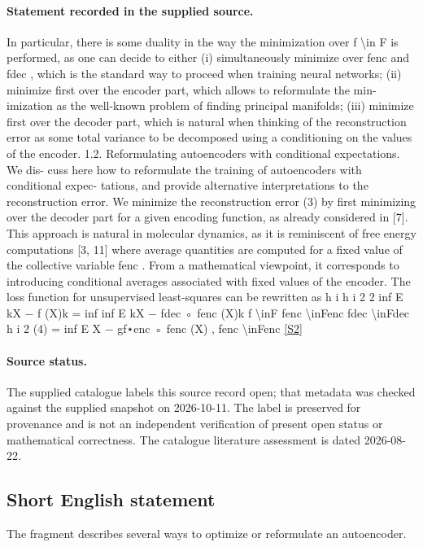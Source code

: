 \documentclass[11pt]{article}
\newcommand{\sref}[2]{\hyperlink{source:#1:#2}{[S#2]}}
\begin{document}
\paragraph{Statement recorded in the supplied source.}
In particular, there is some duality in the way the minimization over f \textbackslash{}in F is performed, as one can decide to either (i) simultaneously minimize over fenc and fdec , which is the standard way to proceed when training neural networks; (ii) minimize first over the encoder part, which allows to reformulate the min- imization as the well-known problem of finding principal manifolds; (iii) minimize first over the decoder part, which is natural when thinking of the reconstruction error as some total variance to be decomposed using a conditioning on the values of the encoder. 1.2. Reformulating autoencoders with conditional expectations. We dis- cuss here how to reformulate the training of autoencoders with conditional expec- tations, and provide alternative interpretations to the reconstruction error. We minimize the reconstruction error (3) by first minimizing over the decoder part for a given encoding function, as already considered in [7]. This approach is natural in molecular dynamics, as it is reminiscent of free energy computations [3, 11] where average quantities are computed for a fixed value of the collective variable fenc . From a mathematical viewpoint, it corresponds to introducing conditional averages associated with fixed values of the encoder. The loss function for unsupervised least-squares can be rewritten as h i h i 2 2 inf E kX − f (X)k = inf inf E kX − fdec ◦ fenc (X)k f \textbackslash{}inF fenc \textbackslash{}inFenc fdec \textbackslash{}inFdec h i 2 (4) = inf E X − gf⋆enc ◦ fenc (X) , fenc \textbackslash{}inFenc \sref{30005937}{2}
\paragraph{Source status.}
The supplied catalogue labels this source record open; that metadata was checked against the supplied snapshot on 2026-10-11. The label is preserved for provenance and is not an independent verification of present open status or mathematical correctness. The catalogue literature assessment is dated 2026-08-22.
\subsection{Short English statement}
The fragment describes several ways to optimize or reformulate an autoencoder.
\end{document}

